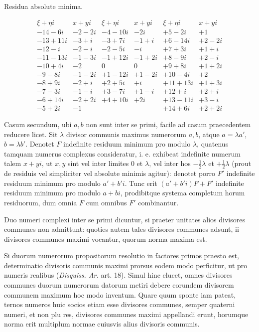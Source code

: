 %
\begin{center}Residua absolute minima.\end{center}
{\small\setlength{\arraycolsep}{3pt}
\[
\begin{array}{r|r||r|r||r|r}
\xi+\eta i&x+yi&\xi+\eta i&x+yi&\xi+\eta i&x+yi\\\hline
-14-6i&-2-2i&-4-10i&-2i&+5-2i&+1\\
-13+11i&-3+i&-3+7i&-1+i&+6-14i&+2-2i\\
-12-i&-2-i&-2-5i&-i&+7+3i&+1+i\\
-11-13i&-1-3i&-1+12i&-1+2i&+8-9i&+2-i\\
-10+4i&-2&0&0&+9+8i&+1+2i\\
-9-8i&-1-2i&+1-12i&+1-2i&+10-4i&+2\\
-8+9i&-2+i&+2+5i&+i&+11+13i&+1+3i\\
-7-3i&-1-i&+3-7i&+1-i&+12+i&+2+i\\
-6+14i&-2+2i&+4+10i&+2i&+13-11i&+3-i\\
-5+2i&-1&&&+14+6i&+2+2i
\end{array}
\]
}

Casum secundum, ubi $a,b$ non sunt inter se primi, facile ad casum praecedentem reducere licet. Sit $\lambda$ divisor communis maximus numerorum $a,b$, atque $a=\lambda a'$, $b=\lambda b'$. Denotet $F$ indefinite residuum minimum pro modulo $\lambda$, quatenus tamquam numerus complexus consideratur, i. e. exhibeat indefinite numerum talem $x+yi$, ut $x,y$ sint vel inter limites $0$ et $\lambda$, vel inter hos $-\frac12\lambda$ et $+\frac12\lambda$ (prout de residuis vel simpliciter vel absolute minimis agitur): denotet porro $F'$ indefinite residuum minimum pro modulo $a'+b'i$. Tunc erit $(a'+b'i)F+F'$ indefinite residuum minimum pro modulo $a+bi$, prodibitque systema completum horum residuorum, dum omnia $F$ cum omnibus $F'$ combinantur.

Duo numeri complexi inter se primi dicuntur, si praeter unitates alios divisores communes non admittunt: quoties autem tales divisores communes adsunt, ii divisores communes maximi vocantur, quorum norma maxima est.

Si duorum numerorum propositorum resolutio in factores primos praesto est, determinatio divisoris communis maximi prorsus eodem modo perficitur, ut pro numeris realibus (\emph{Disquiss. Ar.} art. 18). Simul hinc elucet, omnes divisores communes duorum numerorum datorum metiri debere eorundem divisorem communem maximum hoc modo inventum. Quare quum sponte iam pateat, ternos numeros huic socios etiam esse divisores communes, semper quaterni numeri, et non plu%
%
res, divisores communes maximi appellandi erunt, horumque norma erit multiplum normae cuiusvis alius divisoris communis.

